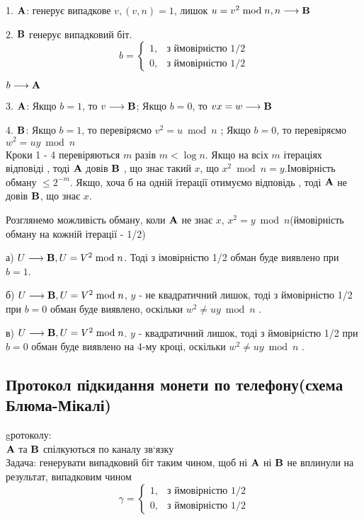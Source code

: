 1. $\bold{A}$: генерує випадкове $v, (v,n) = 1$, лишок $u = v^2\bmod n, n\longrightarrow \bold{B}$
\par2. $\bold{B}$ генерує випадковий біт. 
\begin{equation*}
b = 
	\begin{cases}
		1, &\text{з ймовірністю 1/2}\\
		0, &\text{з ймовірністю 1/2}
	\end{cases}
\end{equation*}
\begin{center}
$b \longrightarrow \bold{A}$
\end{center}
\par3. $\bold{A}$: Якщо $b = 1$, то $v\longrightarrow \bold{B}$; Якщо $b = 0$, то $vx = w\longrightarrow \bold{B}$ 
\par4. $\bold{B}$: Якщо $b = 1$, то перевіряємо $v^2 = u\bmod n$ ; Якщо $b = 0$, то перевіряємо $w^2 = uy\bmod n $\\
Кроки 1 - 4 перевіряються $m$ разів $m < \log n$. Якщо на всіх $m$ ітераціях відповіді \grqq, тоді $\bold{A}$ довів $\bold{B}$ , що знає такий $x$, що $x^2\bmod n = y$.Імовірність обману $\leqslant 2^{-m}$. Якщо, хоча б на одній ітерації отимуємо відповідь  \grqq, тоді $\bold{A}$ не довів $\bold{B}$, що знає $x$.\\


\par Розглянемо можливість обману, коли $\bold{A}$ не знає $x$, $x^2 = y\bmod n$(ймовірність обману на кожній ітерації - 1/2) 
\par а) $U\longrightarrow \bold{B}, U = V^2\bmod n$. Тоді з імовірністю 1/2 обман буде виявлено при $b = 1$.
\par б) $U\longrightarrow \bold{B}, U = V^2\bmod n$, $y$ - не квадратичний лишок, тоді з ймовірністю 1/2 при $b = 0$ обман буде виявлено, оскільки $w^2\ne uy\bmod n$ .
\par в) $U\longrightarrow \bold{B}, U = V^2\bmod n$. $y$ - квадратичний лишок, тоді з ймовірністю 1/2 при $b = 0$ обман буде виявлено на 4-му кроці, оскільки $w^2\ne uy\bmod n$ .\\


\subsection{Протокол підкидання монети по телефону(схема Блюма-Мікалі)}
 gротоколу:\\
$\bold{A}$ та $\bold{B}$ спілкуються по каналу зв`язку\\
Задача: генерувати випадковий біт таким чином, щоб ні $\bold{A}$ ні $\bold{B}$ не вплинули на результат, випадковим чином
\begin{equation*}
\gamma = 
	\begin{cases}
		1, &\text{з ймовірністю 1/2}\\
		0, &\text{з ймовірністю 1/2}
	\end{cases}
\end{equation*}\\


